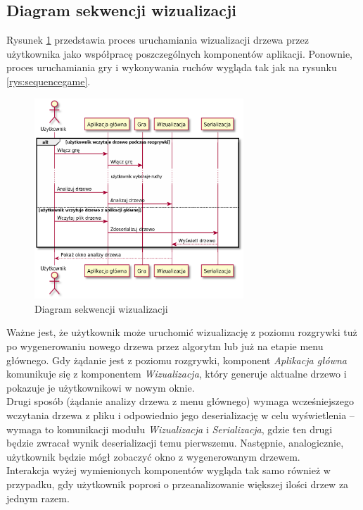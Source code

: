 \documentclass{article}
\newcommand{\modulename}[1]{\textit{#1}}
\begin{document}
\subsection{Diagram sekwencji wizualizacji}
Rysunek \ref{rys:sequencevisualise} przedstawia proces uruchamiania wizualizacji drzewa przez użytkownika jako współpracę poszczególnych komponentów aplikacji. Ponownie, proces uruchamiania gry i wykonywania ruchów wygląda tak jak na rysunku \ref{rys:sequencegame}. 
\begin{figure}[h]
	\centering
	\includegraphics[width=0.7\textwidth]{visualization_sequence_simplified}
	\caption{Diagram sekwencji wizualizacji}
	\label{rys:sequencevisualise}
\end{figure}

\noindent Ważne jest, że użytkownik może uruchomić wizualizację z poziomu rozgrywki tuż po wygenerowaniu nowego drzewa przez algorytm lub już na etapie menu głównego. Gdy żądanie jest z poziomu rozgrywki, komponent \modulename{Aplikacja główna} komunikuje się z komponentem \modulename{Wizualizacja}, który generuje aktualne drzewo i pokazuje je użytkownikowi w nowym oknie. \\

\noindent Drugi sposób (żądanie analizy drzewa z menu głównego) wymaga wcześniejszego wczytania drzewa z pliku i odpowiednio jego deserializację w celu wyświetlenia – wymaga to komunikacji modułu \modulename{Wizualizacja} i \modulename{Serializacja}, gdzie ten drugi będzie zwracał wynik deserializacji temu pierwszemu. Następnie, analogicznie, użytkownik będzie mógł zobaczyć okno z wygenerowanym drzewem.\\

\noindent Interakcja wyżej wymienionych komponentów wygląda tak samo również w przypadku, gdy użytkownik poprosi o przeanalizowanie większej ilości drzew za jednym razem.
\end{document}
